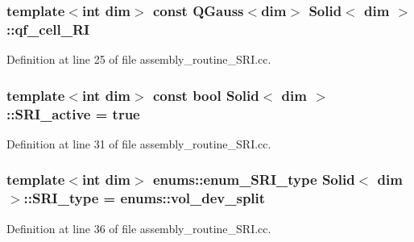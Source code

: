 \subsubsection[{\texorpdfstring{qf\+\_\+cell\+\_\+\+RI}{qf_cell_RI}}]{\setlength{\rightskip}{0pt plus 5cm}template$<$int dim$>$ const Q\+Gauss$<$dim$>$ {\bf Solid}$<$ dim $>$\+::qf\+\_\+cell\+\_\+\+RI\hspace{0.3cm}{\ttfamily [private]}}\hypertarget{classSolid_ab97c4ff4672fdb470c8a33fd0aac4650}{}\label{classSolid_ab97c4ff4672fdb470c8a33fd0aac4650}


Definition at line 25 of file assembly\+\_\+routine\+\_\+\+S\+R\+I.\+cc.

\subsubsection[{\texorpdfstring{S\+R\+I\+\_\+active}{SRI_active}}]{\setlength{\rightskip}{0pt plus 5cm}template$<$int dim$>$ const bool {\bf Solid}$<$ dim $>$\+::S\+R\+I\+\_\+active = true\hspace{0.3cm}{\ttfamily [private]}}\hypertarget{classSolid_a421ff1b855d09ee75f2ea5b1a9642607}{}\label{classSolid_a421ff1b855d09ee75f2ea5b1a9642607}


Definition at line 31 of file assembly\+\_\+routine\+\_\+\+S\+R\+I.\+cc.

\subsubsection[{\texorpdfstring{S\+R\+I\+\_\+type}{SRI_type}}]{\setlength{\rightskip}{0pt plus 5cm}template$<$int dim$>$ {\bf enums\+::enum\+\_\+\+S\+R\+I\+\_\+type} {\bf Solid}$<$ dim $>$\+::S\+R\+I\+\_\+type = {\bf enums\+::vol\+\_\+dev\+\_\+split}\hspace{0.3cm}{\ttfamily [private]}}\hypertarget{classSolid_a0d12ca91579ebfa7c292b48506eca1e2}{}\label{classSolid_a0d12ca91579ebfa7c292b48506eca1e2}


Definition at line 36 of file assembly\+\_\+routine\+\_\+\+S\+R\+I.\+cc.

